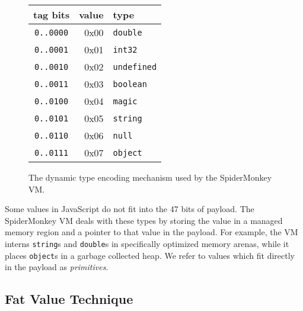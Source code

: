\documentclass[11pt,onecolumn]{article}
\begin{document}
\begin{figure}[h]
\centering
{}
\begin{tabular}{cr | l }
  tag bits & value & type \\
\hline
  \texttt{0..0000} & 0x00 & \texttt{double} \\
  \texttt{0..0001} & 0x01 & \texttt{int32} \\
  \texttt{0..0010} & 0x02 & \texttt{undefined} \\
  \texttt{0..0011} & 0x03 & \texttt{boolean} \\
  \texttt{0..0100} & 0x04 & \texttt{magic} \\
  \texttt{0..0101} & 0x05 & \texttt{string} \\
  \texttt{0..0110} & 0x06 & \texttt{null} \\
  \texttt{0..0111} & 0x07 & \texttt{object} \\
\end{tabular}
 \caption{The dynamic type encoding mechanism used by the SpiderMonkey VM.}
 \label{fig:base-encoding}
\end{figure}

Some values in JavaScript do not fit into the 47 bits of payload.
The SpiderMonkey VM deals with these types by storing the value in a managed memory region and a pointer to that value in the payload.
For example, the VM interns \texttt{string}s and \texttt{double}s in specifically optimized memory arenas, while it places \texttt{object}s in a garbage collected heap.
We refer to values which fit directly in the payload as \emph{primitives}.

\subsection{Fat Value Technique}\label{sec:fat-values}
\end{document}

